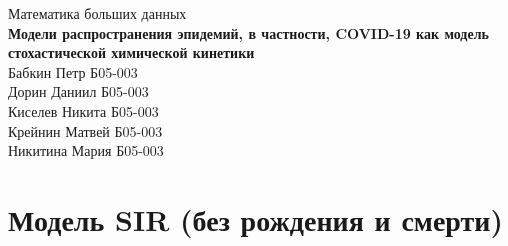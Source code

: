 \documentclass[12pt]{article}
\begin{document}
\newcommand{\prob}[1]{\mathbb{P}\left(#1\right)}


\begin{titlepage}
\null
\vfill
\begin{center}
{\Large Математика больших данных}\\
\vspace{1cm}
{\Huge \textbf{Модели распространения эпидемий, в частности, COVID-19 как модель стохастической химической кинетики}}\\
\vspace{1cm}
{\Large Бабкин Петр Б05-003}\\
{\Large Дорин Даниил Б05-003}\\
{\Large Киселев Никита Б05-003}\\
{\Large Крейнин Матвей Б05-003}\\
{\Large Никитина Мария Б05-003}
\end{center}
\vfill
\null
\end{titlepage}


\section*{Модель SIR (без рождения и смерти)}
\end{document}
